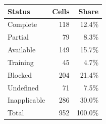 \begin{tabular}{@{}lrr@{}}
\toprule
Status & Cells & Share \\
\midrule
Complete & 118 & 12.4\% \\
Partial & 79 & 8.3\% \\
Available & 149 & 15.7\% \\
Training & 45 & 4.7\% \\
Blocked & 204 & 21.4\% \\
Undefined & 71 & 7.5\% \\
Inapplicable & 286 & 30.0\% \\
\midrule
Total & 952 & 100.0\% \\
\bottomrule
\end{tabular}
